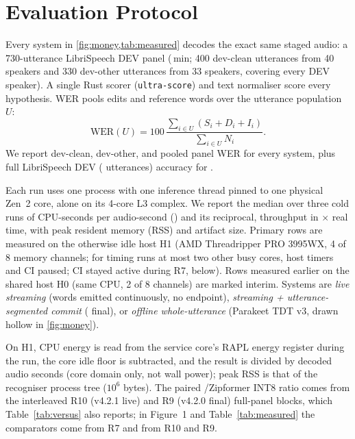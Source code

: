 \section{Evaluation Protocol}\label{sec:protocol}

 Every system in \cref{fig:money,tab:measured} decodes the exact same
staged audio: a 730-utterance LibriSpeech DEV panel (\ColdAudioMinutes\,min; 400 dev-clean utterances
from 40 speakers and 330 dev-other utterances from 33 speakers, covering every DEV speaker). A single
Rust scorer (\texttt{ultra-score}) and text normaliser score every hypothesis. WER pools edits and
reference words over the utterance population $U$:
\begin{equation}
\mathrm{WER}(U)=100\,\frac{\sum_{i\in U}(S_i+D_i+I_i)}{\sum_{i\in U}N_i}.
\end{equation}
We report dev-clean, dev-other, and pooled panel WER for every system, plus full LibriSpeech DEV
(\RelFullUtts{} utterances) accuracy for \ultra{}.

 Each run uses one process with one inference thread pinned to one
physical Zen~2 core, alone on its 4-core L3 complex. We report the median over three cold runs of
CPU-seconds per audio-second (\cpus) and its reciprocal, throughput in $\times$ real time, with peak
resident memory (RSS) and artifact size. Primary rows are measured on the otherwise idle host H1
(AMD Threadripper PRO 3995WX, 4 of 8 memory channels; for timing runs at most two other busy cores,
host timers and CI paused; CI stayed active during R7, below). Rows measured earlier on the shared host H0 (same CPU, 2 of 8 channels) are marked interim. Systems are \emph{live streaming} (words emitted continuously, no endpoint),
\emph{streaming + utterance-segmented commit} (\ultra{} final), or \emph{offline whole-utterance}
(Parakeet TDT v3, drawn hollow in \cref{fig:money}).

 On H1, CPU energy is read from the service core's RAPL energy register during the
run, the core idle floor is subtracted, and the result is divided by decoded audio seconds (core domain
only, not wall power); peak RSS is that of the recogniser process tree ($10^6$ bytes). The paired
\ultra{}/Zipformer INT8 ratio comes from the interleaved R10 (v4.2.1 live) and R9 (v4.2.0 final) full-panel blocks, which
Table~\ref{tab:versus} also reports; in Figure~1 and Table~\ref{tab:measured} the comparators come from R7 and \ultra{}
from R10 and R9.

